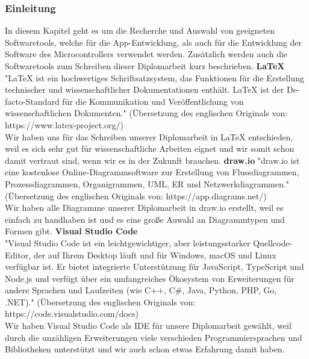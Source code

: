 \documentclass[]{article}
\begin{document}
\subsubsection{Einleitung}
In diesem Kapitel geht es um die Recherche und Auswahl von geeigneten Softwaretools, welche für die App-Entwicklung, als auch für die Entwicklung der Software des Microcontrollers verwendet werden. Zusätzlich werden auch die Softwaretools zum Schreiben dieser Diplomarbeit kurz beschrieben. 
\vspace{4mm}\newline
\textbf{LaTeX} \\
"LaTeX ist ein hochwertiges Schriftsatzsystem, das Funktionen für die Erstellung technischer und wissenschaftlicher Dokumentationen enthält. LaTeX ist der De-facto-Standard für die Kommunikation und Veröffentlichung von wissenschaftlichen Dokumenten." (Übersetzung des englischen Originals von: https://www.latex-project.org/) \\
Wir haben uns für das Schreiben unserer Diplomarbeit in LaTeX entschieden, weil es sich sehr gut für wissenschaftliche Arbeiten eignet und wir somit schon damit vertraut sind, wenn wir es in der Zukunft brauchen.
\vspace{4mm}\newline
\textbf{draw.io}
"draw.io ist eine kostenlose Online-Diagrammsoftware zur Erstellung von Flussdiagrammen, Prozessdiagrammen, Organigrammen, UML, ER und Netzwerkdiagrammen." (Übersetzung des englischen Originals von: https://app.diagrams.net/) \\
Wir haben alle Diagramme unserer Diplomarbeit in draw.io erstellt, weil es einfach zu handhaben ist und es eine große Auwahl an Diagrammtypen und Formen gibt.
\vspace{4mm}\newline
\textbf{Visual Studio Code} \\
"Visual Studio Code ist ein leichtgewichtiger, aber leistungsstarker Quellcode-Editor, der auf Ihrem Desktop läuft und für Windows, macOS und Linux verfügbar ist. Er bietet integrierte Unterstützung für JavaScript, TypeScript und Node.js und verfügt über ein umfangreiches Ökosystem von Erweiterungen für andere Sprachen und Laufzeiten (wie C++, C\#, Java, Python, PHP, Go, .NET)." (Übersetzung des englischen Originals von: https://code.visualstudio.com/docs) \\
Wir haben Visual Studio Code als IDE für unsere Diplomarbeit gewählt, weil durch die unzähligen Erweiterungen viele verschieden Programmiersprachen und Bibliotheken unterstützt und wir auch schon etwas Erfahrung damit haben. 
\end{document}
